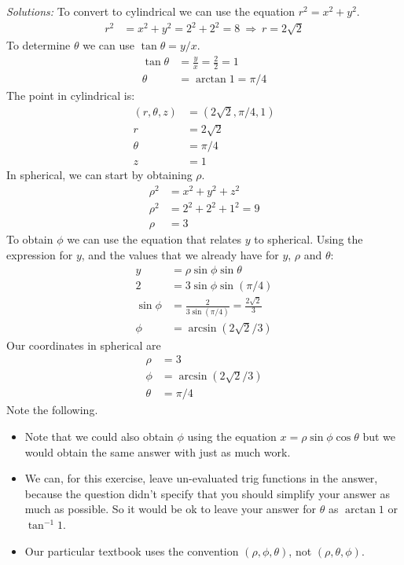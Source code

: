     \ifnum {} {\color{DarkBlue} \textit{Solutions:} To convert to cylindrical we can use the equation $r^2 = x^2 + y^2$. 
    \begin{align}
        r^2 &= x^2 + y^2 = 2^2 + 2^2 = 8 \ \Rightarrow \ r = 2\sqrt2
    \end{align}
    To determine $\theta$ we can use $\tan\theta = y/x$. 
    \begin{align}
        \tan \theta &= \frac{y}{x} = \frac{2}{2} = 1  \\
        \theta &= \arctan 1 = \pi/4
    \end{align} 
    The point in cylindrical is: 
    \begin{align}
        (r,\theta,z) &= (2\sqrt2,\pi/4,1) \\
        r &= 2\sqrt2 \\
        \theta &= \pi/4 \\
        z &= 1
    \end{align}
    In spherical, we can start by obtaining $\rho$. 
    \begin{align}
        \rho^2 &= x^2+y^2+z^2\\
        \rho^2 &= 2^2 + 2^2 + 1^2 = 9 \\
        \rho &= 3
    \end{align}
    To obtain $\phi$ we can use the equation that relates $y$ to spherical. Using the expression for $y$, and the values that we already have for $y$, $\rho$ and $\theta$:
    \begin{align}
        y &= \rho \sin\phi \sin\theta \\
        2 &= 3\sin\phi \sin(\pi/4) \\
        \sin\phi &= \frac{2}{3 \sin(\pi/4)}  = \frac{2\sqrt2}{3}\\
        \phi &= \arcsin (2\sqrt2/3)
    \end{align}
    Our coordinates in spherical are
    \begin{align}
        \rho &= 3\\
        \phi &= \arcsin (2\sqrt2/3)\\
        \theta &= \pi/4
    \end{align}
    Note the following.
    \begin{itemize}
        \item Note that we could also obtain $\phi$ using the equation $x = \rho \sin\phi \cos\theta$ but we would obtain the same answer with just as much work. 
        \item We can, for this exercise, leave un-evaluated trig functions in the answer, because the question didn't specify that you should simplify your answer as much as possible. So it would be ok to leave your answer for $\theta$ as $\arctan 1$ or $\tan^{-1} 1$. 
        \item Our particular textbook uses the convention $(\rho, \phi, \theta)$, not $(\rho, \theta,\phi)$.
    \end{itemize}
    } 
    \else
      
